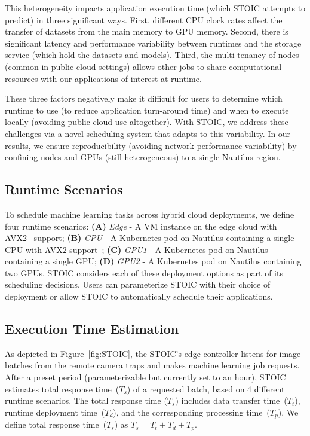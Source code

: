 This heterogeneity impacts application execution time (which STOIC attempts to predict) in three significant ways. First, different CPU clock rates affect the transfer of datasets from the main memory to GPU memory. Second, there is significant latency and performance variability between runtimes and the storage service (which hold the datasets and models). Third, the multi-tenancy of nodes (common in public cloud settings) allows other jobs to share computational resources with our applications of interest at runtime. 

These three factors negatively make it difficult for users to determine which runtime to use (to reduce application turn-around time) and when to execute locally (avoiding public  cloud use altogether). With STOIC, we address these challenges via a novel scheduling system that adapts to this variability. In our results, we ensure reproducibility (avoiding network performance variability) by confining nodes and GPUs (still heterogeneous) to a single Nautilus region.

\subsection{Runtime Scenarios}

To schedule machine learning tasks across hybrid cloud deployments, we define four runtime scenarios: \textbf{(A)} \textit{Edge} - A VM instance on the edge cloud with AVX2~\cite{ref:avx} support; \textbf{(B)} \textit{CPU} - A Kubernetes pod on Nautilus containing a single CPU with AVX2 support~\cite{ref:avx}; \textbf{(C)} \textit{GPU1} - A Kubernetes pod on Nautilus containing a single GPU; \textbf{(D)} \textit{GPU2} - A Kubernetes pod on Nautilus containing two GPUs.  STOIC considers each of these deployment options as part of its scheduling decisions. Users can parameterize STOIC with their choice of deployment or allow STOIC to automatically schedule their applications.

\subsection{Execution Time Estimation}

As depicted in Figure~\ref{fig:STOIC}, the STOIC's edge controller listens for image batches from the remote camera traps and makes machine learning job requests. After a preset period (parameterizable but currently set to an hour), STOIC estimates total response time~($T_s$) of a requested batch, based on 4 different runtime scenarios. The total response time ($T_s$) includes data transfer time~($T_t$), runtime deployment time~($T_d$), and the corresponding processing time~($T_p$). We define total response time~($T_s$) as $T_s = T_t + T_d + T_p$.
 
